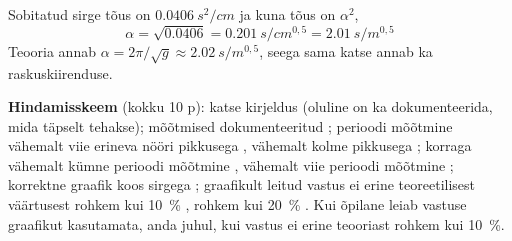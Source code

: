 Sobitatud sirge tõus on $\SI{0,0406}{s^2/cm}$ ja kuna tõus on $\alpha^2$,
\[
\alpha = \sqrt{\num{0,0406}} = \SI{0,201}{s/cm^{0,5}}
= \SI{2,01}{s/m^{0,5}}
\]
Teooria annab $\alpha = 2\pi/\sqrt{g} \approx \SI{2,02}{s/m^{0,5}}$, seega
sama katse annab ka raskuskiirenduse.

\textbf{Hindamisskeem} (kokku 10 p): katse kirjeldus  (oluline on ka
dokumenteerida, mida täpselt tehakse); mõõtmised dokumenteeritud ;
perioodi mõõtmine vähemalt viie erineva nööri pikkusega , vähemalt
kolme pikkusega ; korraga vähemalt kümne perioodi mõõtmine ,
vähemalt viie perioodi mõõtmine ; korrektne graafik koos sirgega
; graafikult leitud vastus ei erine teoreetilisest väärtusest rohkem
kui \SI{10}{\percent} , rohkem kui \SI{20}{\percent} . Kui
õpilane leiab vastuse graafikut kasutamata, anda  juhul, kui vastus ei
erine teooriast rohkem kui \SI{10}{\percent}.
\probend
